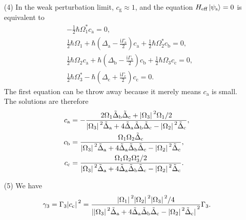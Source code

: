 \documentclass[hyperref, a4paper]{article}
\newcommand*{\ii}{\mathrm{i}}
\begin{document}
\begin{itemize}
\item[(4)] In the weak perturbation limit, $c_\text{g} \approx 1$, and the equation 
$H_\text{eff} \ket*{\psi_\text{s}} = 0$ is equivalent to 
\[
    \begin{aligned}
        &- \frac{1}{2} \hbar \Omega_1^* c_\text{a} = 0, \\
        & \frac{1}{2} \hbar \Omega_1 + \hbar \left( \Delta_\text{a} - \frac{\ii \Gamma_\text{a}}{2}  \right) c_\text{a} + \frac{1}{2} \hbar \Omega_2^* c_\text{b} = 0, \\
        &\frac{1}{2} \hbar \Omega_2 c_\text{a} + \hbar \left( \Delta_\text{b} - \frac{\ii \Gamma_\text{b}}{2}  \right) c_\text{b} + \frac{1}{2} \hbar \Omega_3 c_\text{c} = 0, \\
        &\frac{1}{2} \hbar \Omega_3^* - \hbar \left( \Delta_\text{c} + \frac{\ii \Gamma_\text{c}}{2} \right) c_\text{c} = 0.
    \end{aligned}
\]
The first equation can be throw away because it merely means $c_\text{a}$ is small. The solutions are therefore 
\begin{equation}
    \begin{aligned}
        c_\text{a} &= - \frac{2 \Omega_1 \tilde{\Delta}_\text{b} \tilde{\Delta}_\text{c} +  \abs*{\Omega_3}^2 \Omega_1 / 2 }{ \abs*{\Omega_3}^2 \tilde{\Delta}_\text{a} + 4 \tilde{\Delta}_\text{a} \tilde{\Delta}_\text{b} \tilde{\Delta}_\text{c} - \abs*{\Omega_2}^2 \tilde{\Delta}_\text{c} }, \\
        c_\text{b} &= \frac{\Omega_1 \Omega_2 \tilde{\Delta}_\text{c}}{ \abs*{\Omega_3}^2 \tilde{\Delta}_\text{a} + 4 \tilde{\Delta}_\text{a} \tilde{\Delta}_\text{b} \tilde{\Delta}_\text{c} - \abs*{\Omega_2}^2 \tilde{\Delta}_\text{c} }, \\
        c_\text{c} &= \frac{\Omega_1 \Omega_2 \Omega_3^* / 2 }{ \abs*{\Omega_3}^2 \tilde{\Delta}_\text{a} + 4 \tilde{\Delta}_\text{a} \tilde{\Delta}_\text{b} \tilde{\Delta}_\text{c} - \abs*{\Omega_2}^2 \tilde{\Delta}_\text{c} }.
    \end{aligned}
\end{equation}

\item[(5)] We have 
\begin{equation}
    \gamma_3 = \Gamma_3 \abs*{c_\text{c}}^2 = \frac{\abs*{\Omega_1}^2 \abs*{\Omega_2}^2 \abs*{\Omega_3}^2 / 4 }{ \abs*{\abs*{\Omega_3}^2 \tilde{\Delta}_\text{a} + 4 \tilde{\Delta}_\text{a} \tilde{\Delta}_\text{b} \tilde{\Delta}_\text{c} - \abs*{\Omega_2}^2 \tilde{\Delta}_\text{c}}^2 } \Gamma_3.
\end{equation} 


\end{itemize}
\end{document}
